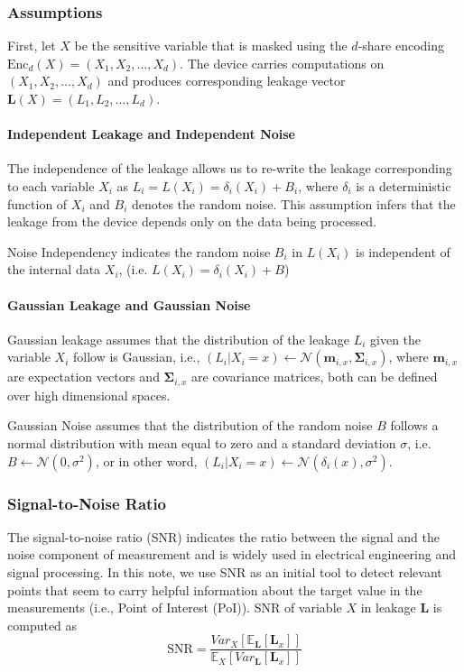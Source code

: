 \documentclass{llncs}
\begin{document}
	\subsubsection*{Assumptions}
	First, let $X$ be the sensitive variable that is masked using the $d$-share encoding $\text{Enc}_d(X) = (X_1, X_2, \dots, X_d)$. The device carries computations on $(X_1, X_2, \dots, X_d)$ and produces corresponding leakage vector $\bm{L}(X) = (L_1, L_2, \dots, L_d)$.
	\paragraph{Independent Leakage and Independent Noise}
	The independence of the leakage allows us to re-write the leakage corresponding to each variable $X_i$ as $L_i = L(X_i)  = \delta_i(X_i) + B_i$, where $\delta_i$ is a deterministic function of $X_i$ and $B_i$ denotes the random noise. This assumption infers that the leakage from the device depends only on the data being processed.
	
	Noise Independency indicates the random noise $B_i$ in $L(X_i)$ is independent of the internal data $X_i$, (i.e. $L(X_i)  = \delta_i(X_i) + B$)
	\paragraph{Gaussian Leakage and Gaussian Noise}
	Gaussian leakage assumes that the distribution of the leakage $L_i$ given the variable $X_i$ follow is Gaussian, i.e., $(L_i|X_i=x) \leftarrow \mathcal{N}(\bm{m}_{i, x}, \bm{\Sigma}_{i, x})$, where $\bm{m}_{i, x}$ are expectation vectors and $\bm{\Sigma}_{i, x}$ are covariance matrices, both can be defined over high dimensional spaces.
	
	Gaussian Noise assumes that the distribution of the random noise $B$ follows a normal distribution with mean equal to zero and a standard deviation $\sigma$, i.e. $B \leftarrow \mathcal{N}(0, \sigma^2)$, or in other word, $(L_i|X_i=x) \leftarrow \mathcal{N}(\delta_i(x), \sigma^2)$.
	\subsubsection*{Signal-to-Noise Ratio}
	The signal-to-noise ratio (SNR) indicates the ratio between the signal and the noise component of measurement and is widely used in electrical engineering and signal processing. In this note, we use SNR as an initial tool to detect relevant points that seem to carry helpful information about the target value in the measurements (i.e., Point of Interest (PoI)).
	SNR of variable $X$ in leakage $\bm{L}$ is computed as
	\begin{equation*}
		\text{SNR} = \frac{Var_{X}[\mathbb{E}_{\bm{L}}[\bm{L}_x]]}{\mathbb{E}_{X}[Var_{\bm{L}}[\bm{L}_x]]}
	\end{equation*}
\end{document}
